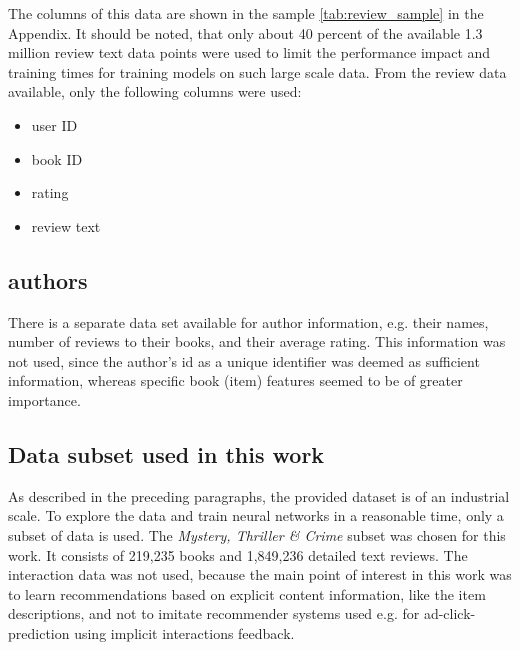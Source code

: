 \documentclass[10pt,final,journal,a4paper,oneside,twocolumn]{IEEEtran}
\begin{document}
The columns of this data are shown in the sample \autoref{tab:review_sample} in the Appendix. It should be noted, that only about 40 percent of the available 1.3 million review text data points were used to limit the performance impact and training times for training models on such large scale data.
From the review data available, only the following columns were used:
\begin{itemize}
    \item user ID
    \item book ID
    \item rating
    \item review text
\end{itemize}

\subsection{authors}
There is a separate data set available for author information, e.g. their names, number of reviews to their books, and their average rating. This information was not used, since the author's id as a unique identifier was deemed as sufficient information, whereas specific book (item) features seemed to be of greater importance.

\subsection{Data subset used in this work}\label{sec:data_used}
As described in the preceding paragraphs, the provided dataset is of an industrial scale. To explore the data and train neural networks in a reasonable time, only a subset of data is used.
The \emph{Mystery, Thriller \& Crime} subset was chosen for this work. It consists of 219,235 books and 1,849,236 detailed text reviews. The interaction data was not used, because the main point of interest in this work was to learn recommendations based on explicit content information, like the item descriptions, and not to imitate recommender systems used e.g. for ad-click-prediction using implicit interactions feedback.
\end{document}
